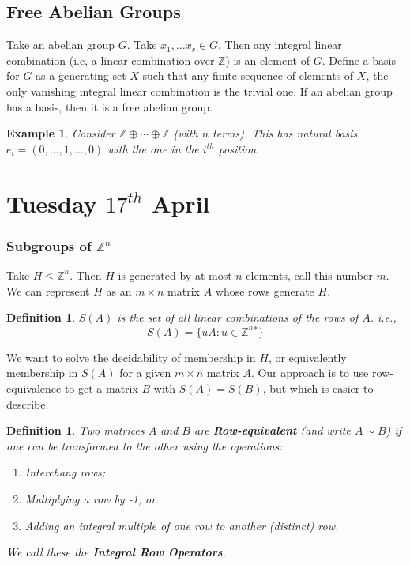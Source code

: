 \documentclass[a4paper,10pt]{article}
\newcommand{\ZZ}{\mathbb{Z}}
\newtheorem{Def}[thm]{Definition}
\newtheorem{eg}[thm]{Example}
\begin{document}
 
\subsection{Free Abelian Groups}

Take an abelian group $G$. Take $x_1, \dots x_r \in G$. Then any integral linear combination (i.e, a linear combination over $\ZZ$) is an element of $G$. Define a basis for $G$ as a generating set $X$ such that any finite sequence of elements of $X$, the only vanishing integral linear combination is the trivial one. If an abelian group has a basis, then it is a free abelian group.

\begin{eg}
Consider $\ZZ \oplus \cdots \oplus \ZZ$ (with $n$ terms). This has natural basis $e_i = (0, \dots, 1, \dots, 0)$ with the one in the $i^{th}$ position.
\end{eg}







\newpage

\section{Tuesday $17^{th}$ April}

\subsubsection{Subgroups of $\ZZ^n$}

Take $H \leq \ZZ^n$. Then $H$ is generated by at most $n$ elements, call this number $m$. We can represent $H$ as an $m\times n$ matrix $A$ whose rows generate $H$. 

\begin{Def}
$S(A)$ is the set of all linear combinations of the rows of $A$. i.e.,
\[ S(A) = \{ uA : u \in \ZZ^n{}^* \} \]
\end{Def}

We want to solve the decidability of membership in $H$, or equivalently membership in $S(A)$ for a given $m \times n$ matrix $A$. Our approach is to use row-equivalence to get a matrix $B$ with $S(A) = S(B)$, but which is easier to describe.

\begin{Def}
Two matrices $A$ and $B$ are \textbf{Row-equivalent} (and write $A \sim B$) if one can be transformed to the other using the operations:
\begin{enumerate}
\item Interchang  rows;
\item Multiplying a row by -1; or
\item Adding an integral multiple of one row to another (distinct) row.
\end{enumerate}
We call these the \textbf{Integral Row Operators}.
\end{Def}
 
\end{document}
